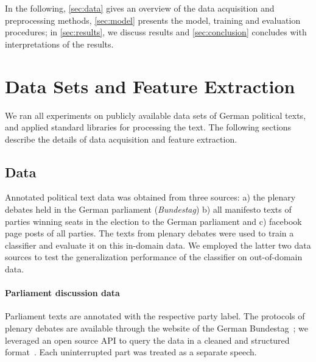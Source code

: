 \documentclass[11pt]{article}
\begin{document}
In the following, \autoref{sec:data} gives an overview of the data acquisition and preprocessing methods, \autoref{sec:model} presents the model, training and evaluation procedures; in \autoref{sec:results}, we discuss results and \autoref{sec:conclusion} concludes with interpretations of the results.

\section{Data Sets and Feature Extraction}\label{sec:data}
%
We ran all experiments on publicly available data sets of German political texts, and applied standard libraries for processing the text. The following sections describe the details of data acquisition and feature extraction.

\subsection{Data}
Annotated political text data was obtained from three sources: a) the plenary debates held in the German parliament ({\em Bundestag}) b) all manifesto texts of parties winning seats in the election to the German parliament and c) facebook page posts of all parties. The texts from plenary debates were used to train a classifier and evaluate it on this in-domain data. We employed the latter two data sources to test the generalization performance of the classifier on out-of-domain data. 

\paragraph{Parliament discussion data} Parliament texts are annotated with the respective party label. The protocols of plenary debates are available through the website of the German Bundestag~\cite{bundestag}; we leveraged an open source API to query the data in a cleaned and structured format~\cite{bundestag-github}. Each uninterrupted part was treated as a separate speech. 
\end{document}
